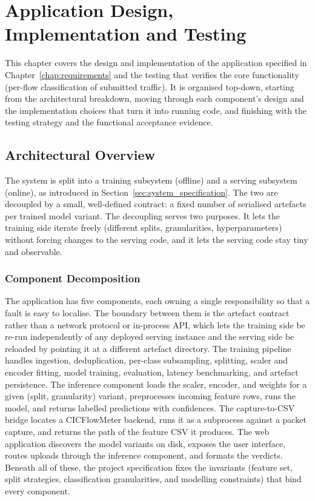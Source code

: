 \chapter{Application Design, Implementation and Testing}
\label{chap:design_implementation}

\par This chapter covers the design and implementation of the application specified in Chapter~\ref{chap:requirements} and the testing that verifies the core functionality (per-flow classification of submitted traffic). It is organised top-down, starting from the architectural breakdown, moving through each component's design and the implementation choices that turn it into running code, and finishing with the testing strategy and the functional acceptance evidence.

\section{Architectural Overview}
\label{sec:architecture_overview}

\par The system is split into a training subsystem (offline) and a serving subsystem (online), as introduced in Section~\ref{sec:system_specification}. The two are decoupled by a small, well-defined contract: a fixed number of serialised artefacts per trained model variant. The decoupling serves two purposes. It lets the training side iterate freely (different splits, granularities, hyperparameters) without forcing changes to the serving code, and it lets the serving code stay tiny and observable.

\subsection{Component Decomposition}
\label{subsec:module_decomposition}

\par The application has five components, each owning a single responsibility so that a fault is easy to localise. The boundary between them is the artefact contract rather than a network protocol or in-process API, which lets the training side be re-run independently of any deployed serving instance and the serving side be reloaded by pointing it at a different artefact directory. The training pipeline handles ingestion, deduplication, per-class subsampling, splitting, scaler and encoder fitting, model training, evaluation, latency benchmarking, and artefact persistence. The inference component loads the scaler, encoder, and weights for a given (split, granularity) variant, preprocesses incoming feature rows, runs the model, and returns labelled predictions with confidences. The capture-to-CSV bridge locates a CICFlowMeter backend, runs it as a subprocess against a packet capture, and returns the path of the feature CSV it produces. The web application discovers the model variants on disk, exposes the user interface, routes uploads through the inference component, and formats the verdicts. Beneath all of these, the project specification fixes the invariants (feature set, split strategies, classification granularities, and modelling constraints) that bind every component.

